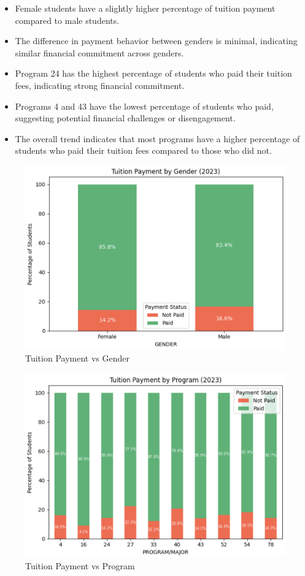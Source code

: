 \documentclass[12pt]{article}
\begin{document}
\begin{itemize}
    \item Female students have a slightly higher percentage of tuition payment compared to male students.
    \item The difference in payment behavior between genders is minimal, indicating similar financial commitment across genders.
    \item Program 24 has the highest percentage of students who paid their tuition fees, indicating strong financial commitment.
    \item Programs 4 and 43 have the lowest percentage of students who paid, suggesting potential financial challenges or disengagement.
    \item The overall trend indicates that most programs have a higher percentage of students who paid their tuition fees compared to those who did not.
\end{itemize}

\begin{figure}[H]
    \centering
    \includegraphics[width=0.55\linewidth]{tuition_payment_gender.png}
    \caption{Tuition Payment vs Gender}
\end{figure}

\begin{figure}[H]
    \centering
    \includegraphics[width=0.55\linewidth]{tuition_payment_program.png}
    \caption{Tuition Payment vs Program}
\end{figure}
\end{document}
